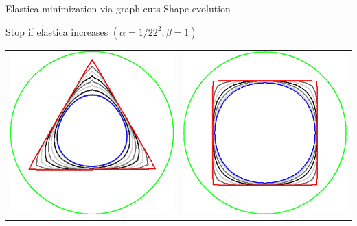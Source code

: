 \begin{frame}
{Elastica minimization via graph-cuts}
{Shape evolution}

\begin{center}
Stop if elastica increases $(\alpha=1/22^2,\beta=1)$\\[1em]

\begin{tabular}{cc}
\includegraphics[scale=0.12]{figures/graphcut/no-neighborhood-flow-always-improve/0.0020661157/triangle.png}\hspace{3em} &
\includegraphics[scale=0.12]{figures/graphcut/no-neighborhood-flow-always-improve/0.0020661157/square.png}\\[2em]

\end{tabular}
\end{center}
\end{frame}

